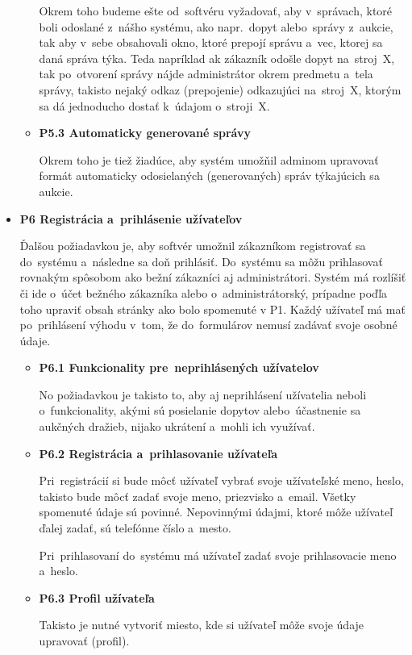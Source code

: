 \begin{itemize}
\begin{itemize}
Okrem toho budeme ešte od~softvéru vyžadovať, aby v~správach, ktoré boli odoslané z~nášho systému, ako napr.~dopyt alebo~správy z~aukcie, tak aby v~sebe obsahovali okno, ktoré prepojí správu a~vec, ktorej sa daná správa týka. Teda napríklad ak zákazník odošle dopyt na~stroj~X, tak po~otvorení správy nájde administrátor okrem predmetu a~tela správy, takisto nejaký odkaz (prepojenie) odkazujúci na~stroj~X, ktorým sa dá jednoducho dostať k~údajom o~stroji~X.

\item \textbf{P5.3 Automaticky generované správy}

Okrem toho je tiež žiadúce, aby systém umožňil adminom upravovať formát automaticky odosielaných (generovaných) správ týkajúcich sa aukcie.
\end{itemize}

\item \textbf{P6 Registrácia a~prihlásenie užívateľov}

Ďalšou požiadavkou je, aby softvér umožnil zákazníkom registrovať sa do~systému a~následne sa doň prihlásiť. Do~systému sa môžu prihlasovať rovnakým spôsobom ako bežní zákazníci aj administrátori. Systém má rozlíšiť či ide o~účet bežného zákazníka alebo o~administrátorský, prípadne poďľa toho upraviť obsah stránky ako bolo spomenuté v P1. Každý užívateľ má mať po~prihlásení výhodu v~tom, že do~formulárov nemusí zadávať svoje osobné údaje.

\begin{itemize}
\item \textbf{P6.1 Funkcionality pre~neprihlásených užívatelov}

No požiadavkou je takisto to, aby aj neprihlásení užívatelia neboli o~funkcionality, akými sú posielanie dopytov alebo~účastnenie sa aukčných dražieb, nijako ukrátení a~mohli ich využívať.

\item \textbf{P6.2 Registrácia a~prihlasovanie užívateľa}

Pri~registrácií si bude môcť užívateľ vybrať svoje užívateľské meno, heslo, takisto bude môcť zadať svoje meno, priezvisko a~email. Všetky spomenuté údaje sú povinné. Nepovinnými údajmi, ktoré môže užívateľ ďalej zadať, sú telefónne číslo a~mesto.

Pri~prihlasovaní do~systému má užívateľ zadať svoje prihlasovacie meno a~heslo.

\item \textbf{P6.3 Profil užívateľa}

Takisto je nutné vytvoriť miesto, kde si užívateľ môže svoje údaje upravovať (profil).
\end{itemize}


\end{itemize}
